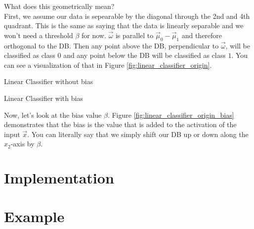 What does this geometrically mean?\\
First, we assume our data is sepearable by the diagonal through the 2nd and 4th quadrant. This is the same as saying that the data is linearly separable and we won't need a threshold $\beta$ for now.
$\vec{\omega}$ is parallel to ${\vec{\mu}_0-\vec{\mu}_1}$ and therefore orthogonal to the DB.
Then any point above the DB, perpendicular to $\vec{\omega}$, will be classified as class $0$ and any point below the DB will be classified as class $1$. You can see a visualization of that in Figure \ref{fig:linear_classifier_origin}.

\begin{minipage}{.45\textwidth}
  \centering
  
  \caption{Linear Classifier without bias}
  \label{fig:linear_classifier_origin}
\end{minipage}
\hfill
\begin{minipage}{.45\textwidth}
  \centering
  
  \caption{Linear Classifier with bias}
  \label{fig:linear_classifier_origin_bias}
\end{minipage}

Now, let's look at the bias value $\beta$. Figure \ref{fig:linear_classifier_origin_bias} demonstrates that the bias is the value that is added to the activation of the input $\vec{x}$.
You can literally say that we simply shift our DB up or down along the $x_2$-axis by $\beta$.



\section{Implementation}
\framedtext{\color{red}{TODO:}}


\section{Example}
\framedtext{\color{red}{TODO:}}

